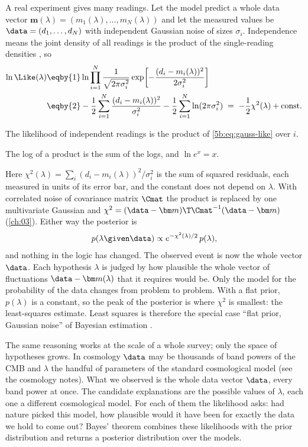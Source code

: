 A real experiment gives many readings. Let the model predict a whole data vector
$\bm m(\lambda)=(m_1(\lambda),\dots,m_N(\lambda))$ and let the measured values be
$\data=(d_1,\dots,d_N)$ with independent Gaussian noise of sizes $\sigma_i$.
Independence means the joint density of all readings
is the product of the single-reading densities , so
\begin{align}
  \ln\Like(\lambda)
  &\eqby{1}\ln\prod_{i=1}^N\frac{1}{\sqrt{2\pi\sigma_i^2}}
     \exp\!\left[-\frac{(d_i-m_i(\lambda))^2}{2\sigma_i^2}\right]
   \nonumber\\
  &\eqby{2}-\frac12\sum_{i=1}^N\frac{(d_i-m_i(\lambda))^2}{\sigma_i^2}
     -\frac12\sum_{i=1}^N\ln(2\pi\sigma_i^2)
   \;=\;-\frac12\chi^2(\lambda)+\text{const}.
  \label{5b:eq:chi2}
\end{align}
\begin{explain}
  \item The likelihood of independent readings is the product of
        \eqref{5b:eq:gauss-like} over $i$.
  \item The log of a product is the sum of the logs, and $\ln e^{x}=x$.
\end{explain}
Here $\chi^2(\lambda)=\sum_i(d_i-m_i(\lambda))^2/\sigma_i^2$ is the sum of squared
residuals, each measured in units of its error bar, and the constant does not depend on
$\lambda$. With correlated noise of covariance matrix
$\Cmat$ the product is replaced by one multivariate Gaussian and
$\chi^2=(\data-\bm m)\T\Cmat^{-1}(\data-\bm m)$ (\cref{ch:03}). Either way the posterior
is
\begin{equation}
  p(\lambda\given\data)\propto e^{-\chi^2(\lambda)/2}\,p(\lambda),
  \label{5b:eq:post-chi2}
\end{equation}
and nothing in the logic has changed. The observed event is now the whole vector
$\data$. Each hypothesis $\lambda$ is judged by how plausible the whole vector of
fluctuations $\data-\bm m(\lambda)$ that it requires would be. Only the model for the
probability of the data changes from problem to problem. With a flat prior, $p(\lambda)$
is a constant, so the peak of the posterior is where $\chi^2$ is smallest: the
least-squares estimate. Least squares is therefore the special case ``flat prior,
Gaussian noise'' of Bayesian estimation .

The same reasoning works at the scale of a whole survey; only the space of hypotheses
grows. In cosmology $\data$ may be thousands of band powers of the CMB and $\lambda$ the
handful of parameters of the standard cosmological model (see the cosmology notes). What we observed is the whole data
vector $\data$, every band power at once. The candidate explanations are the
possible values of $\lambda$, each one a different cosmological model. For each
of them the likelihood asks: had nature picked this model, how plausible would
it have been for exactly the data we hold to come out? Bayes' theorem combines
these likelihoods with the prior distribution and returns a posterior
distribution over the models.

